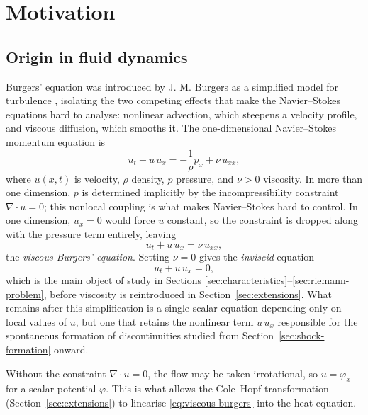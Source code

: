 \section{Motivation}
\label{sec:motivation}

\subsection{Origin in fluid dynamics}
\label{subsec:fluid-origin}

Burgers' equation was introduced by J. M. Burgers as a simplified model
for turbulence \cite{burgers1948}, isolating the two competing effects
that make the Navier--Stokes equations hard to analyse: nonlinear
advection, which steepens a velocity profile, and viscous diffusion,
which smooths it. The one-dimensional Navier--Stokes momentum equation is
\begin{equation}
  \label{eq:1d-navier-stokes}
  u_t + u\,u_x = -\frac{1}{\rho} p_x + \nu\, u_{xx},
\end{equation}
where $u(x,t)$ is velocity, $\rho$ density, $p$ pressure, and $\nu > 0$
viscosity. In more than one dimension, $p$ is determined implicitly by
the incompressibility constraint $\nabla \cdot u = 0$; this nonlocal
coupling is what makes Navier--Stokes hard to control. In one dimension,
$u_x = 0$ would force $u$ constant, so the constraint is dropped along
with the pressure term entirely, leaving
\begin{equation}
  \label{eq:viscous-burgers}
  u_t + u\, u_x = \nu\, u_{xx},
\end{equation}
the \emph{viscous Burgers' equation}. Setting $\nu = 0$ gives the
\emph{inviscid} equation
\begin{equation}
  \label{eq:inviscid-burgers}
  u_t + u\, u_x = 0,
\end{equation}
which is the main object of study in Sections
\ref{sec:characteristics}--\ref{sec:riemann-problem}, before viscosity is
reintroduced in Section~\ref{sec:extensions}. What remains after this
simplification is a single scalar equation depending only on local values
of $u$, but one that retains the nonlinear term $u\,u_x$ responsible for
the spontaneous formation of discontinuities studied from
Section~\ref{sec:shock-formation} onward.

\begin{remark}
\label{rem:vorticity-free}
Without the constraint $\nabla \cdot u = 0$, the flow may be taken
irrotational, so $u = \varphi_x$ for a scalar potential $\varphi$. This is
what allows the Cole--Hopf transformation (Section~\ref{sec:extensions})
to linearise \eqref{eq:viscous-burgers} into the heat equation.
\end{remark}

